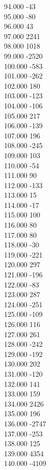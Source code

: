 { 94.000	-43 \\
 95.000	-80 \\
 96.000	43 \\
 97.000	2241 \\
 98.000	1018 \\
 99.000	-2520 \\
 100.000	-583 \\
 101.000	-262 \\
 102.000	180 \\
 103.000	-123 \\
 104.000	-106 \\
 105.000	217 \\
 106.000	-139 \\
 107.000	196 \\
 108.000	-245 \\
 109.000	103 \\
 110.000	-54 \\
 111.000	90 \\
 112.000	-133 \\
 113.000	15 \\
 114.000	-17 \\
 115.000	100 \\
 116.000	80 \\
 117.000	80 \\
 118.000	-30 \\
 119.000	-221 \\
 120.000	297 \\
 121.000	-196 \\
 122.000	-83 \\
 123.000	287 \\
 124.000	-251 \\
 125.000	-109 \\
 126.000	116 \\
 127.000	261 \\
 128.000	-242 \\
 129.000	-192 \\
 130.000	202 \\
 131.000	-120 \\
 132.000	141 \\
 133.000	159 \\
 134.000	2426 \\
 135.000	196 \\
 136.000	-2747 \\
 137.000	-253 \\
 138.000	125 \\
 139.000	4354 \\
 140.000	-4109 \\
}
